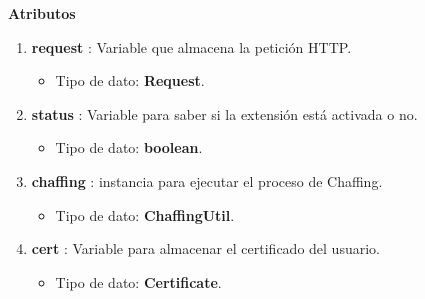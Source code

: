 \documentclass[12pt, a4paper, titlepage]{report}
\begin{document}
                    \textbf{Atributos}
                    \begin{enumerate}
    		            \item \textbf{request} : Variable que almacena la petición HTTP.
        		        \begin{itemize}
        		            \item Tipo de dato: \textbf{Request}.
        		        \end{itemize}
        		        \item \textbf{status} : Variable para saber si la extensión está activada o no.
        		        \begin{itemize}
        		            \item Tipo de dato: \textbf{boolean}.
        		        \end{itemize}
        		        \item \textbf{chaffing} : instancia para ejecutar el proceso de Chaffing.
        		        \begin{itemize}
        		            \item Tipo de dato: \textbf{ChaffingUtil}.
        		        \end{itemize}
        		        \item \textbf{cert} : Variable para almacenar el certificado del usuario.
        		        \begin{itemize}
        		            \item Tipo de dato: \textbf{Certificate}.
        		        \end{itemize}
                    \end{enumerate}
                    
\end{document}
